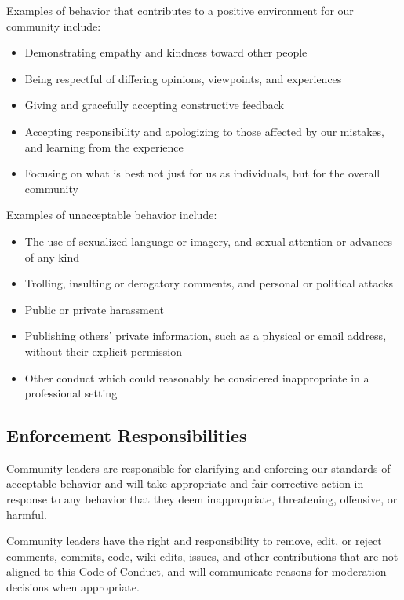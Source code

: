 \documentclass[
  fontsize=13pt,
  english,
  a4paper,
  openany, a4paper, oneside]{article}
\providecommand{\tightlist}{%
  \setlength{\itemsep}{0pt}\setlength{\parskip}{0pt}}
\begin{document}
Examples of behavior that contributes to a positive environment for our
community include:

\begin{itemize}
\tightlist
\item
  Demonstrating empathy and kindness toward other people
\item
  Being respectful of differing opinions, viewpoints, and experiences
\item
  Giving and gracefully accepting constructive feedback
\item
  Accepting responsibility and apologizing to those affected by our mistakes,
  and learning from the experience
\item
  Focusing on what is best not just for us as individuals, but for the
  overall community
\end{itemize}

Examples of unacceptable behavior include:

\begin{itemize}
\tightlist
\item
  The use of sexualized language or imagery, and sexual attention or
  advances of any kind
\item
  Trolling, insulting or derogatory comments, and personal or political attacks
\item
  Public or private harassment
\item
  Publishing others' private information, such as a physical or email
  address, without their explicit permission
\item
  Other conduct which could reasonably be considered inappropriate in a
  professional setting
\end{itemize}

\hypertarget{enforcement-responsibilities}{%
\subsection{Enforcement Responsibilities}\label{enforcement-responsibilities}}

Community leaders are responsible for clarifying and enforcing our standards of
acceptable behavior and will take appropriate and fair corrective action in
response to any behavior that they deem inappropriate, threatening, offensive,
or harmful.

Community leaders have the right and responsibility to remove, edit, or reject
comments, commits, code, wiki edits, issues, and other contributions that are
not aligned to this Code of Conduct, and will communicate reasons for moderation
decisions when appropriate.
\end{document}

